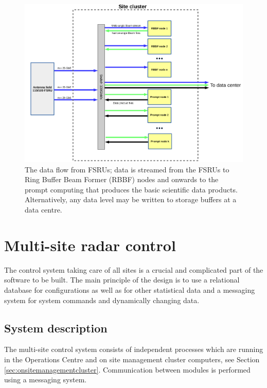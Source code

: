 \documentclass[12pt,a4paper]{article}
\begin{document}
\begin{figure}[h!]
\centering
\includegraphics[scale=0.35]{E3d_data_flow_modified.png}
\caption{
The data flow from FSRUs; data is streamed from the FSRUs to Ring Buffer Beam Former (RBBF) nodes and onwards to the prompt computing that produces the basic scientific data products. Alternatively, any data level may be written to storage buffers at a data centre.\label{fig-data-chain}}
\end{figure}

\section{Multi-site radar control}
The control system taking care of all \ED sites is a crucial and complicated part of the software to be built. 
The main principle of the design is to use a relational database for configurations as well as for other statistical data and a messaging system for system commands and dynamically changing data. 

\subsection{System description}

The multi-site control system consists of independent processes which are running in the Operations Centre and on site management cluster computers, see Section~ \ref{sec:onsitemanagementcluster}. Communication between modules is performed using a messaging system. 
\end{document}
